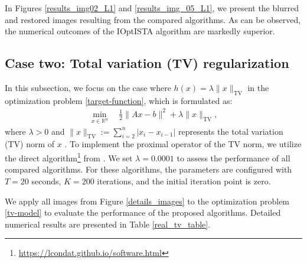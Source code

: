 \documentclass{article}
\begin{document}
In Figures \ref{results_img02_L1} and \ref{results_img_05_L1}, we present the blurred and restored images resulting from the compared algorithms. As can be observed, the numerical outcomes of the IOptISTA algorithm are markedly superior.




\subsection{Case two: Total variation (TV) regularization}\label{tv-regularization}

In this subsection, we focus on the case where $h(x) = \lambda \|x\|_{\mathrm{TV}}$ \cite{ChanCW99, JiangL21} in the optimization problem \eqref{target-function}, which is formulated as:
\begin{eqnarray}
\min_{x \in \mathbb{R}^n} \quad \frac{1}{2} \|Ax - b\|^2 + \lambda \|x\|_{\mathrm{TV}}, \label{tv-model}
\end{eqnarray}
where $\lambda > 0$ and $\|x\|_{\mathrm{TV}} := \sum_{i=2}^{n} |x_i - x_{i-1}|$ represents the total variation (TV) norm of $x$ \cite{RudinOF92}. To implement the proximal operator of the TV norm, we utilize the direct algorithm\footnote{\url{https://lcondat.github.io/software.html}} from \cite{Condat13}. We set $\lambda = 0.0001$ to assess the performance of all compared algorithms. For these algorithms, the parameters are configured with $T = 20$ seconds, $K = 200$ iterations, and the initial iteration point is zero.


We apply all images from Figure \ref{details_images} to the optimization problem \eqref{tv-model} to evaluate the performance of the proposed algorithms. Detailed numerical results are presented in Table \ref{real_tv_table}.
\end{document}
